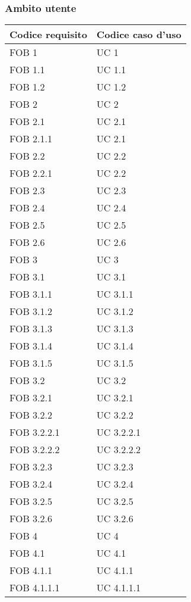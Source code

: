 \subsubsection{Ambito utente}
\begin{longtable}{p{} p{}}
\rowcolors{2}{light}{}
\textbf{Codice requisito} & \textbf{Codice caso d'uso}\\
\midrule
\midrule
FOB 1 & UC 1\\
\midrule
FOB 1.1 & UC 1.1\\
\midrule
FOB 1.2 & UC 1.2\\
\midrule
FOB 2 & UC 2\\
\midrule
FOB 2.1 & UC 2.1\\
\midrule
FOB 2.1.1 & UC 2.1\\
\midrule
FOB 2.2 & UC 2.2\\
\midrule
FOB 2.2.1 & UC 2.2\\
\midrule
FOB 2.3 & UC 2.3\\
\midrule
FOB 2.4 & UC 2.4\\
\midrule
FOB 2.5 & UC 2.5\\
\midrule
FOB 2.6 & UC 2.6\\
\midrule
FOB 3 & UC 3\\
\midrule
FOB 3.1 & UC 3.1\\
\midrule
FOB 3.1.1 & UC 3.1.1\\
\midrule
FOB 3.1.2 & UC 3.1.2\\
\midrule
FOB 3.1.3 & UC 3.1.3\\
\midrule
FOB 3.1.4 & UC 3.1.4\\
\midrule
FOB 3.1.5 & UC 3.1.5\\
\midrule
FOB 3.2 & UC 3.2\\
\midrule
FOB 3.2.1 & UC 3.2.1\\
\midrule
FOB 3.2.2 & UC 3.2.2\\
\midrule
FOB 3.2.2.1 & UC 3.2.2.1\\
\midrule
FOB 3.2.2.2 & UC 3.2.2.2\\
\midrule
FOB 3.2.3 & UC 3.2.3\\
\midrule
FOB 3.2.4 & UC 3.2.4\\
\midrule
FOB 3.2.5 & UC 3.2.5\\
\midrule
FOB 3.2.6 & UC 3.2.6\\
\midrule
FOB 4 & UC 4\\
\midrule
FOB 4.1 & UC 4.1\\
\midrule
FOB 4.1.1 & UC 4.1.1\\
\midrule
FOB 4.1.1.1 & UC 4.1.1.1\\

\end{longtable}
